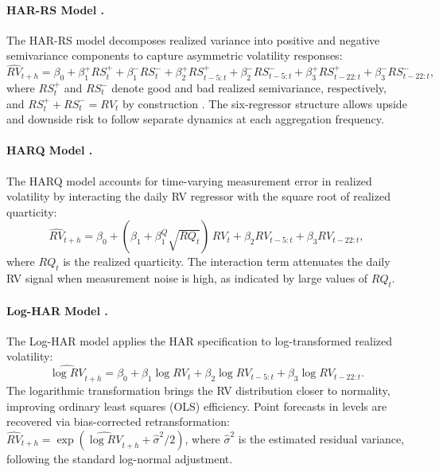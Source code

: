 \documentclass[12pt]{article}
\begin{document}
\paragraph{HAR-RS Model \citep{patton2015}.}
The HAR-RS model decomposes realized variance into positive and negative semivariance components to capture asymmetric volatility responses:
\begin{equation}
  \widehat{RV}_{t+h} = \beta_0 + \beta_1^+ RS_t^+ + \beta_1^- RS_t^- + \beta_2^+ RS_{t-5:t}^+ + \beta_2^- RS_{t-5:t}^- + \beta_3^+ RS_{t-22:t}^+ + \beta_3^- RS_{t-22:t}^- ,
  \label{eq:har_rs}
\end{equation}
where $RS_t^+$ and $RS_t^-$ denote good and bad realized semivariance, respectively, and $RS_t^+ + RS_t^- = RV_t$ by construction \citep{barndorffnielsen2010semivariance}. The six-regressor structure allows upside and downside risk to follow separate dynamics at each aggregation frequency.

\paragraph{HARQ Model \citep{bollerslev2016harq}.}
The HARQ model accounts for time-varying measurement error in realized volatility by interacting the daily RV regressor with the square root of realized quarticity:
\begin{equation}
  \widehat{RV}_{t+h} = \beta_0 + (\beta_1 + \beta_1^Q \sqrt{RQ_t})\, RV_t + \beta_2 RV_{t-5:t} + \beta_3 RV_{t-22:t},
  \label{eq:harq}
\end{equation}
where $RQ_t$ is the realized quarticity. The interaction term attenuates the daily RV signal when measurement noise is high, as indicated by large values of $RQ_t$.

\paragraph{Log-HAR Model \citep{corsi2009}.}
The Log-HAR model applies the HAR specification to log-transformed realized volatility:
\begin{equation}
  \widehat{\log RV}_{t+h} = \beta_0 + \beta_1 \log RV_t + \beta_2 \log RV_{t-5:t} + \beta_3 \log RV_{t-22:t}.
  \label{eq:log_har}
\end{equation}
The logarithmic transformation brings the RV distribution closer to normality, improving ordinary least squares (OLS) efficiency. Point forecasts in levels are recovered via bias-corrected retransformation: $\widehat{RV}_{t+h} = \exp(\widehat{\log RV}_{t+h} + \hat{\sigma}^2/2)$, where $\hat{\sigma}^2$ is the estimated residual variance, following the standard log-normal adjustment.
\end{document}
